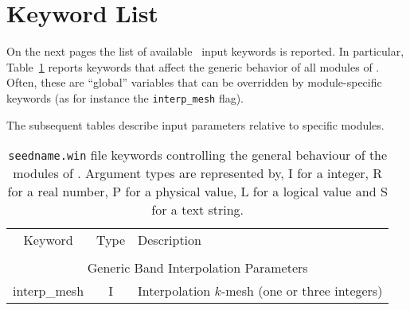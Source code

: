 \section{Keyword List}
On the next pages the list of available
\postw\ input keywords is reported.
In particular, Table~\ref{parameter_keywords_postw90} reports keywords
that affect the generic behavior of all modules of
\postw. Often, these are ``global'' variables that can be overridden
by module-specific keywords (as for instance the {\tt interp\_mesh} flag).

The subsequent tables describe input parameters relative to specific modules.

\clearpage

\begin{table}[hH!]
\begin{center}
\begin{tabular}{|c|c|p{6cm}|}
\hline
Keyword & Type & Description \\
        &      &             \\
\hline\hline
\multicolumn{3}{|c|}{Generic Band Interpolation Parameters} \\
\hline
{\sc interp\_mesh}   & I & Interpolation $k$-mesh (one or three integers) \\
\hline
\end{tabular}
\caption[Parameter file keywords controlling \postw.]
{{\tt seedname.win} file keywords controlling the general behaviour of
  the modules of \postw. Argument types
are represented by, I for a integer, R for a real number, P for a
physical value, L for a logical value and S for a text string.}
\label{parameter_keywords_postw90}
\end{center}
\end{table}


